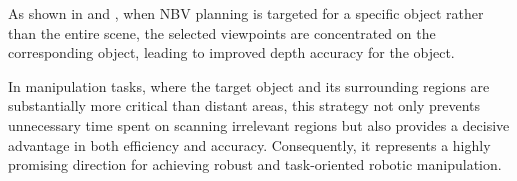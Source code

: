 

As shown in  and , when \ac{NBV} planning is targeted for a specific object rather than the entire scene, the selected viewpoints are concentrated on the corresponding object, leading to improved depth accuracy for the object.

In manipulation tasks, where the target object and its surrounding regions are substantially more critical than distant areas, this strategy not only prevents unnecessary time spent on scanning irrelevant regions but also provides a decisive advantage in both efficiency and accuracy. Consequently, it represents a highly promising direction for achieving robust and task-oriented robotic manipulation.



